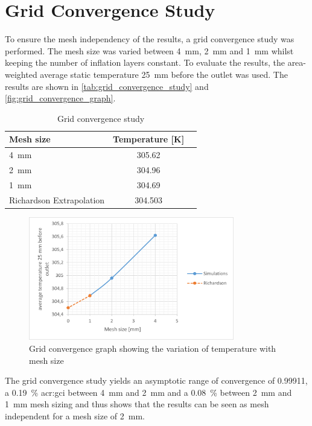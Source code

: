 \section{Grid Convergence Study}
\label{sec:grid_convergence_study}

To ensure the mesh independency of the results, a grid convergence study was performed.
The mesh size was varied between \qty{4}{\milli\meter}, \qty{2}{\milli\meter} and \qty{1}{\milli\meter} whilst keeping the number of inflation layers constant. To evaluate the results, the area-weighted average static temperature \qty{25}{\milli\meter} before the outlet was used.
The results are shown in \autoref{tab:grid_convergence_study} and \autoref{fig:grid_convergence_graph}.

\begin{table}[htbp]
    \centering
    \caption{Grid convergence study}
    \label{tab:grid_convergence_study}
    \begin{tabular}{lcc}
        \toprule
        Mesh size & Temperature [\unit{\kelvin}] \\
        \midrule
        \qty{4}{\milli\meter} & 305.62 \\
        \qty{2}{\milli\meter} & 304.96 \\
        \qty{1}{\milli\meter} & 304.69 \\
        Richardson Extrapolation & 304.503 \\
        \bottomrule
    \end{tabular}
\end{table}

\begin{figure}[htbp]
    \centering
    \includegraphics[width=0.8\textwidth]{img/grid_convergence_graph}
    \caption{Grid convergence graph showing the variation of temperature with mesh size}
    \label{fig:grid_convergence_graph}
\end{figure}

The grid convergence study yields an asymptotic range of convergence of 0.99911, a \qty{0.19}{\percent} \gls{acr:gci} between \qty{4}{\milli\meter} and \qty{2}{\milli\meter} and a \qty{0.08}{\percent}  between \qty{2}{\milli\meter} and \qty{1}{\milli\meter} mesh sizing and thus shows that the results can be seen as mesh independent for a mesh size of \qty{2}{\milli\meter}.


